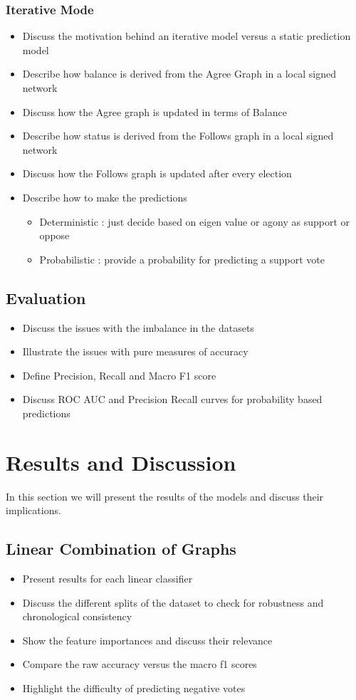 \subsection{Iterative Mode}
\begin{itemize}
    \item Discuss the motivation behind an iterative model versus a static prediction model
    \item Describe how balance is derived from the Agree Graph in a local signed network
    \item Discuss how the Agree graph is updated in terms of Balance
    \item Describe how status is derived from the Follows graph in a local signed network 
    \item Discuss how the Follows graph is updated after every election
    \item Describe how to make the predictions 
    \begin{itemize}
        \item Deterministic : just decide based on eigen value or agony as support or oppose
        \item Probabilistic : provide a probability for predicting a support vote
    \end{itemize}
\end{itemize}
\section{Evaluation}
\begin{itemize}
    \item Discuss the issues with the imbalance in the datasets
    \item Illustrate the issues with pure measures of accuracy
    \item Define Precision, Recall and Macro F1 score
    \item Discuss ROC AUC and Precision Recall curves for probability based predictions 
\end{itemize}

\chapter{Results and Discussion} 
\label{chp:results}
In this section we will present the results of the models and discuss their implications.
\section{Linear Combination of Graphs}
\begin{itemize}
    \item Present results for each linear classifier
    \item Discuss the different splits of the dataset to check for robustness and chronological consistency
    \item Show the feature importances and discuss their relevance 
    \item Compare the raw accuracy versus the macro f1 scores
    \item Highlight the difficulty of predicting negative votes
\end{itemize}
